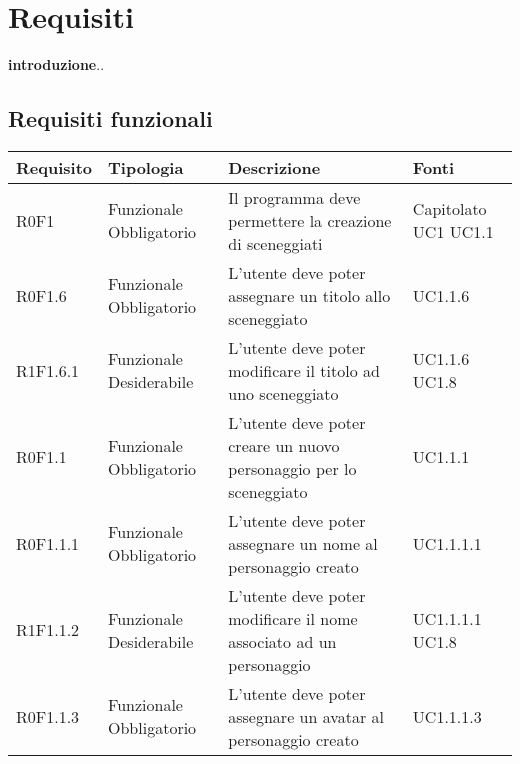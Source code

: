 \section{Requisiti}
\textbf{introduzione}..

\subsection{Requisiti funzionali}
\begin{center}
\def\arraystretch{1.6}
\bgroup
\begin{longtable}{| p{2.5cm} | p{3cm} | p{5.25cm} | p{2cm} |}
\hline
\textbf{Requisito} & \textbf{Tipologia} & \textbf{Descrizione} & \textbf{Fonti}\\ \hline \hline 

R0F1 & Funzionale \newline Obbligatorio &
Il programma deve permettere la creazione di sceneggiati & 
Capitolato \newline UC1 \newline UC1.1\\ \hline

R0F1.6 & Funzionale \newline Obbligatorio & L'utente deve poter assegnare un titolo allo sceneggiato & UC1.1.6 \\ \hline

R1F1.6.1 & Funzionale \newline Desiderabile & L'utente deve poter modificare il titolo ad uno sceneggiato & UC1.1.6 \newline UC1.8 \\ \hline 

R0F1.1 & Funzionale \newline Obbligatorio & L'utente deve poter creare un nuovo personaggio per lo sceneggiato & UC1.1.1 \\ \hline

R0F1.1.1 & Funzionale \newline Obbligatorio & L'utente deve poter assegnare un nome al personaggio creato & UC1.1.1.1 \\ \hline

R1F1.1.2 & Funzionale \newline Desiderabile & L'utente deve poter modificare il nome associato ad un personaggio & UC1.1.1.1 \newline UC1.8 \\ \hline 

R0F1.1.3 & Funzionale \newline Obbligatorio & L'utente deve poter assegnare un avatar al personaggio creato & UC1.1.1.3 \\ \hline


\end{longtable}
\end{center}
